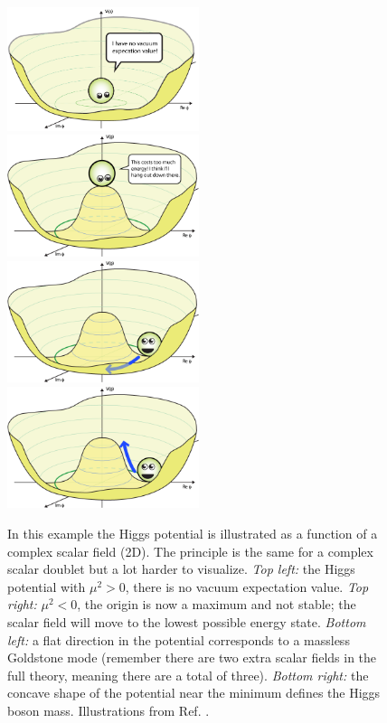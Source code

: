 \begin{figure}
\includegraphics[width=0.5\textwidth]{chapter1/img/BoringPotential}
\includegraphics[width=0.5\textwidth]{chapter1/img/Higgs-Potential-lookdown}
\includegraphics[width=0.5\textwidth]{chapter1/img/Higgs-Potential-Goldstone}
\includegraphics[width=0.5\textwidth]{chapter1/img/Higgs-Potential-radial}
\caption{In this example the Higgs potential is illustrated as a function of a complex scalar field (2D). The principle is the same for a complex scalar doublet but a lot harder to visualize. \textit{Top left:} the Higgs potential with $\mu^2 > 0$, there is no vacuum expectation value. \textit{Top right:} $\mu^2 < 0$, the origin is now a maximum and not stable; the scalar field will move to the lowest possible energy state. \textit{Bottom left:} a flat direction in the potential corresponds to a massless Goldstone mode (remember there are two extra scalar fields in the full theory, meaning there are a total of three). \textit{Bottom right:} the concave shape of the potential near the minimum defines the Higgs boson mass. Illustrations from Ref. \cite{flip}.}
\label{fig:BEHpotential}
\end{figure}


